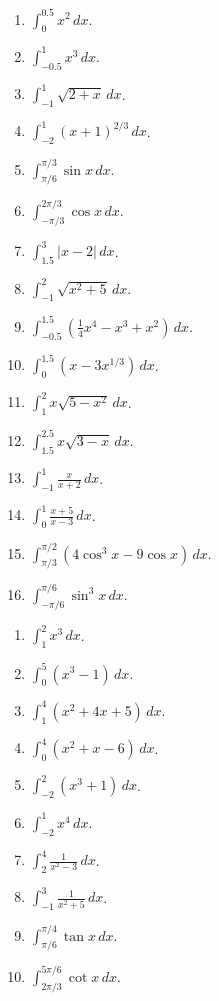 \documentclass[12pt]{article}
\begin{document}
\begin{enumerate}
\item $\displaystyle \int_0^{0.5}x^2\,dx$.
\item $\displaystyle \int_{-0.5}^{1}x^3\,dx$.
\item $\displaystyle \int_{-1}^{1}\sqrt{2+x}\,dx$.
\item $\displaystyle \int_{-2}^{1}(x+1)^{2/3}\,dx$.
\item $\displaystyle \int_{\pi/6}^{\pi/3}\sin x\,dx$.
\item $\displaystyle \int_{-\pi/3}^{2\pi/3}\cos x\,dx$.
\item $\displaystyle \int_{1.5}^{3}|x-2|\,dx$.
\item $\displaystyle \int_{-1}^{2}\sqrt{x^2+5}\,dx$.
\item $\displaystyle \int_{-0.5}^{1.5}\left(\frac14x^4-x^3+x^2\right)\,dx$.
\item $\displaystyle \int_0^{1.5}(x-3x^{1/3})\,dx$.
\item $\displaystyle \int_1^2x\sqrt{5-x^2}\,dx$.
\item $\displaystyle \int_{1.5}^{2.5}x\sqrt{3-x}\,dx$.
\item $\displaystyle \int_{-1}^{1}\frac{x}{x+2}\,dx$.
\item $\displaystyle \int_0^1\frac{x+5}{x-3}\,dx$.
\item $\displaystyle \int_{\pi/3}^{\pi/2}(4\cos^3x-9\cos x)\,dx$.
\item $\displaystyle \int_{-\pi/6}^{\pi/6}\sin^3x\,dx$.
\end{enumerate}

\begin{enumerate}
\item $\displaystyle \int_1^2x^3\,dx$.
\item $\displaystyle \int_0^5(x^3-1)\,dx$.
\item $\displaystyle \int_1^4(x^2+4x+5)\,dx$.
\item $\displaystyle \int_0^4(x^2+x-6)\,dx$.
\item $\displaystyle \int_{-2}^{2}(x^3+1)\,dx$.
\item $\displaystyle \int_{-2}^{1}x^4\,dx$.
\item $\displaystyle \int_2^4\frac1{x^2-3}\,dx$.
\item $\displaystyle \int_{-1}^{3}\frac1{x^2+5}\,dx$.
\item $\displaystyle \int_{\pi/6}^{\pi/4}\tan x\,dx$.
\item $\displaystyle \int_{2\pi/3}^{5\pi/6}\cot x\,dx$.
\end{enumerate}
\end{document}
